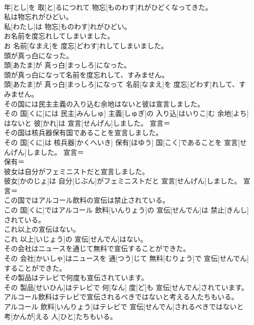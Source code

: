 \documentclass[8pt]{extreport}
\begin{document}
\begin{CJK}{UTF8}{min}
\\	年[とし]を 取[と]るにつれて 物忘[ものわす]れがひどくなってきた。	
\\	私は物忘れがひどい。	
\\	私[わたし]は 物忘[ものわす]れがひどい。	
\\	お名前を度忘れしてしまいました。	
\\	お 名前[なまえ]を 度忘[どわす]れしてしまいました。	
\\	頭が真っ白になった。	
\\	頭[あたま]が 真っ白[まっしろ]になった。	
\\	頭が真っ白になって名前を度忘れして、すみません。	
\\	頭[あたま]が 真っ白[まっしろ]になって 名前[なまえ]を 度忘[どわす]れして、すみません。	
\\	その国には民主主義の入り込む余地はないと彼は宣言しました。	
\\	その 国[くに]には 民主[みんしゅ] 主義[しゅぎ]の 入り込[はいりこ]む 余地[よち]はないと 彼[かれ]は 宣言[せんげん]しました。	宣言＝ 
\\	その国は核兵器保有国であることを宣言しました。	
\\	その 国[くに]は 核兵器[かくへいき] 保有[ほゆう] 国[こく]であることを 宣言[せんげん]しました。	宣言＝ 
\\	保有＝ 
\\	彼女は自分がフェミニストだと宣言しました。	
\\	彼女[かのじょ]は 自分[じぶん]がフェミニストだと 宣言[せんげん]しました。	宣言＝ 
\\	この国ではアルコール飲料の宣伝は禁止されている。	
\\	この 国[くに]ではアルコール 飲料[いんりょう]の 宣伝[せんでん]は 禁止[きんし]されている。	
\\	これ以上の宣伝はない。	
\\	これ 以上[いじょう]の 宣伝[せんでん]はない。	
\\	その会社はニュースを通じて無料で宣伝することができた。	
\\	その 会社[かいしゃ]はニュースを 通[つう]じて 無料[むりょう]で 宣伝[せんでん]することができた。	
\\	その製品はテレビで何度も宣伝されています。	
\\	その 製品[せいひん]はテレビで 何[なん] 度[ど]も 宣伝[せんでん]されています。	
\\	アルコール飲料はテレビで宣伝されるべきではないと考える人たちもいる。	
\\	アルコール 飲料[いんりょう]はテレビで 宣伝[せんでん]されるべきではないと 考[かんが]える 人[ひと]たちもいる。	

\end{CJK}
\end{document}
